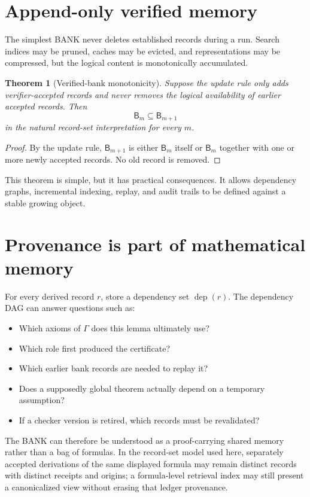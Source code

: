 \documentclass[11pt,openany]{book}
\newtheorem{theorem}{Theorem}[chapter]
\theoremstyle{definition}
\theoremstyle{remark}
\newcommand{\Bank}{\mathsf{B}}
\begin{document}
\section{Append-only verified memory}
The simplest BANK never deletes established records during a run. Search indices may be pruned, caches may be evicted, and representations may be compressed, but the logical content is monotonically accumulated.

\begin{theorem}[Verified-bank monotonicity]\label{thm:monotone}
Suppose the update rule only adds verifier-accepted records and never removes the logical availability of earlier accepted records. Then
\[
\Bank_m\subseteq\Bank_{m+1}
\]
in the natural record-set interpretation for every $m$.
\end{theorem}
\begin{proof}
By the update rule, $\Bank_{m+1}$ is either $\Bank_m$ itself or $\Bank_m$ together with one or more newly accepted records. No old record is removed.
\end{proof}

This theorem is simple, but it has practical consequences. It allows dependency graphs, incremental indexing, replay, and audit trails to be defined against a stable growing object.

\section{Provenance is part of mathematical memory}
For every derived record $r$, store a dependency set $\operatorname{dep}(r)$. The dependency DAG can answer questions such as:
\begin{itemize}
\item Which axioms of $\Gamma$ does this lemma ultimately use?
\item Which role first produced the certificate?
\item Which earlier bank records are needed to replay it?
\item Does a supposedly global theorem actually depend on a temporary assumption?
\item If a checker version is retired, which records must be revalidated?
\end{itemize}

The BANK can therefore be understood as a proof-carrying shared memory rather than a bag of formulas. In the record-set model used here, separately accepted derivations of the same displayed formula may remain distinct records with distinct receipts and origins; a formula-level retrieval index may still present a canonicalized view without erasing that ledger provenance.
\end{document}
